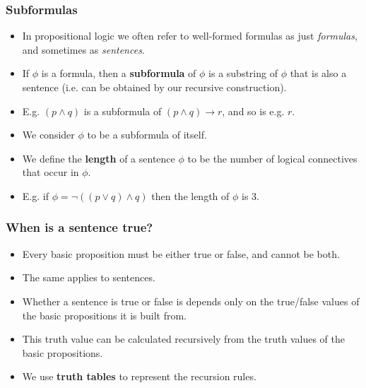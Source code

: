 \documentclass[handout]{beamer}
\begin{document}
\begin{frame}
\frametitle{Subformulas}
\begin{itemize}
\item In propositional logic we often refer to well-formed formulas as just \emph{formulas}, and sometimes as \emph{sentences}.
\vspace{0.3cm}
\item If $\phi$ is a formula, then a \textbf{subformula} of $\phi$ is a substring of $\phi$ that is also a sentence (i.e. can be obtained by our recursive construction).
\vspace{0.3cm}
\item E.g.  $(p\wedge q)$ is a subformula of $(p\wedge q)\rightarrow r$, and so is e.g. $r$. 
\vspace{0.3cm}
\item We consider $\phi$ to be a subformula of itself. 
\vspace{0.3cm}
\item We define the \textbf{length} of a sentence $\phi$ to be the number of logical connectives that occur in $\phi$. 
\vspace{0.3cm}
\item E.g. if $\phi = \neg((p\vee q)\wedge q)$ then the length of $\phi$ is 3.
\end{itemize}
\end{frame}

\begin{frame}
\frametitle{When is a sentence true?}
\begin{itemize}
\item Every basic proposition must be either true or false, and cannot be both.
\vspace{0.3cm}
\item The same applies to sentences.
\vspace{0.3cm}
\item Whether a sentence is true or false is depends only on the true/false values of the basic propositions it is built from.
\vspace{0.3cm}
\item This truth value can be calculated recursively from the truth values of the basic propositions. 
\vspace{0.3cm}
\item We use \textbf{truth tables} to represent the recursion rules.
\end{itemize}
\end{frame}
\end{document}
